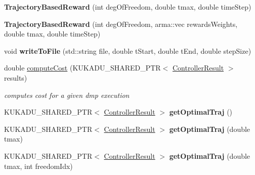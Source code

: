 \begin{DoxyCompactItemize}
\item 
{\bfseries Trajectory\+Based\+Reward} (int deg\+Of\+Freedom, double tmax, double time\+Step)\hypertarget{classkukadu_1_1TrajectoryBasedReward_a646065b5b00ac72e582f9553ca790f32}{}\label{classkukadu_1_1TrajectoryBasedReward_a646065b5b00ac72e582f9553ca790f32}

\item 
{\bfseries Trajectory\+Based\+Reward} (int deg\+Of\+Freedom, arma\+::vec rewards\+Weights, double tmax, double time\+Step)\hypertarget{classkukadu_1_1TrajectoryBasedReward_a6778592c4f88c8abdc0327f12080c550}{}\label{classkukadu_1_1TrajectoryBasedReward_a6778592c4f88c8abdc0327f12080c550}

\item 
void {\bfseries write\+To\+File} (std\+::string file, double t\+Start, double t\+End, double step\+Size)\hypertarget{classkukadu_1_1TrajectoryBasedReward_a434ee68a4e810d796789eebbd5ce17bf}{}\label{classkukadu_1_1TrajectoryBasedReward_a434ee68a4e810d796789eebbd5ce17bf}

\item 
double \hyperlink{classkukadu_1_1TrajectoryBasedReward_a320c223ada03c976b2c545203d1b26d8}{compute\+Cost} (K\+U\+K\+A\+D\+U\+\_\+\+S\+H\+A\+R\+E\+D\+\_\+\+P\+TR$<$ \hyperlink{classkukadu_1_1ControllerResult}{Controller\+Result} $>$ results)
\begin{DoxyCompactList}\small\item\em computes cost for a given dmp execution \end{DoxyCompactList}\item 
K\+U\+K\+A\+D\+U\+\_\+\+S\+H\+A\+R\+E\+D\+\_\+\+P\+TR$<$ \hyperlink{classkukadu_1_1ControllerResult}{Controller\+Result} $>$ {\bfseries get\+Optimal\+Traj} ()\hypertarget{classkukadu_1_1TrajectoryBasedReward_abed1b45c79d4925e3d3ec860a1a2d736}{}\label{classkukadu_1_1TrajectoryBasedReward_abed1b45c79d4925e3d3ec860a1a2d736}

\item 
K\+U\+K\+A\+D\+U\+\_\+\+S\+H\+A\+R\+E\+D\+\_\+\+P\+TR$<$ \hyperlink{classkukadu_1_1ControllerResult}{Controller\+Result} $>$ {\bfseries get\+Optimal\+Traj} (double tmax)\hypertarget{classkukadu_1_1TrajectoryBasedReward_a1faa4baa7554aa2199293b97b67d715e}{}\label{classkukadu_1_1TrajectoryBasedReward_a1faa4baa7554aa2199293b97b67d715e}

\item 
K\+U\+K\+A\+D\+U\+\_\+\+S\+H\+A\+R\+E\+D\+\_\+\+P\+TR$<$ \hyperlink{classkukadu_1_1ControllerResult}{Controller\+Result} $>$ {\bfseries get\+Optimal\+Traj} (double tmax, int freedom\+Idx)\hypertarget{classkukadu_1_1TrajectoryBasedReward_a30b268ffa8e9df7d2b6af3a5741e389e}{}\label{classkukadu_1_1TrajectoryBasedReward_a30b268ffa8e9df7d2b6af3a5741e389e}


\end{DoxyCompactItemize}
